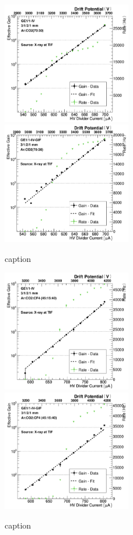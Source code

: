 \begin{figure}[htbp]
    \centering
    \includegraphics[width=0.5\textwidth]{figures/GEM/Gain_curve_GE11_IV_Ar_CO2.jpeg}%
    \includegraphics[width=0.5\textwidth]{figures/GEM/Gain_curve_GE11_IV_GIF_Ar_CO2.jpeg}
    \caption{caption}
    \label{fig:gain_GE1/1_IV}
\end{figure}
\begin{figure}[htbp]
    \centering
    \includegraphics[width=0.5\textwidth]{figures/GEM/Gain_curve_GE11_IV_Ar_CO2_CF4.jpeg}%
    \includegraphics[width=0.5\textwidth]{figures/GEM/Gain_curve_GE11_IV_GIF_Ar_CO2_CF4.jpeg}
    \caption{caption}
    \label{fig:gain_GE1/1_IV_GIF}
\end{figure}
